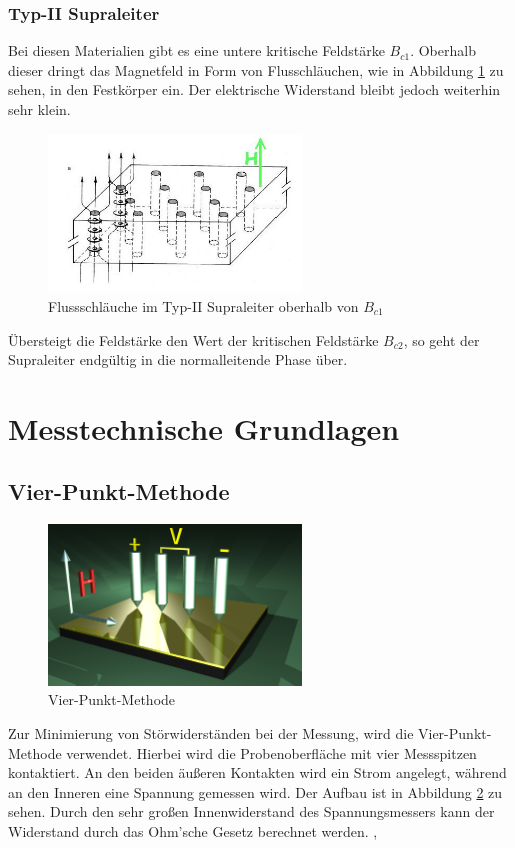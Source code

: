 		\subsubsection{Typ-II Supraleiter}
Bei diesen Materialien gibt es eine untere kritische Feldstärke $B_{c1}$. Oberhalb
dieser dringt das Magnetfeld in Form von Flusschläuchen, wie in Abbildung 
\ref{Abb:flusschlauch} zu sehen, in den Festkörper ein. Der elektrische Widerstand
bleibt jedoch weiterhin sehr klein.
\begin{figure}[h!]
	\centering
	\includegraphics[width=0.6\textwidth]{Abb/flussschlauch.jpg}
	\caption{Flussschläuche im Typ-II Supraleiter oberhalb von $B_{c1}$ 
		     \cite{flussschlauchbild}}
	\label{Abb:flusschlauch}
\end{figure}
Übersteigt die Feldstärke den Wert der kritischen Feldstärke $B_{c2}$, so geht
der Supraleiter endgültig in die normalleitende Phase über. \cite{hunklinger}

	\section{Messtechnische Grundlagen}

		\subsection{Vier-Punkt-Methode}
\begin{figure}[h]
	\centering
	\includegraphics[width=0.6\textwidth]{Abb/vierpunkt.png}
	\caption{Vier-Punkt-Methode \cite{vierpunktwiki}}
	\label{Abb:vierpunkt}
\end{figure}
Zur Minimierung von Störwiderständen bei der Messung, wird die Vier-Punkt-Methode 
verwendet. Hierbei wird die Probenoberfläche mit vier Messspitzen kontaktiert. An
den beiden äußeren Kontakten wird ein Strom angelegt, während an den Inneren eine
Spannung gemessen wird. Der Aufbau ist in Abbildung \ref{Abb:vierpunkt} zu sehen.
Durch den sehr großen Innenwiderstand des Spannungsmessers kann der Widerstand
durch das Ohm'sche Gesetz berechnet werden. \cite{vierpunktwiki}, 
\cite{vierleiterwiki}

